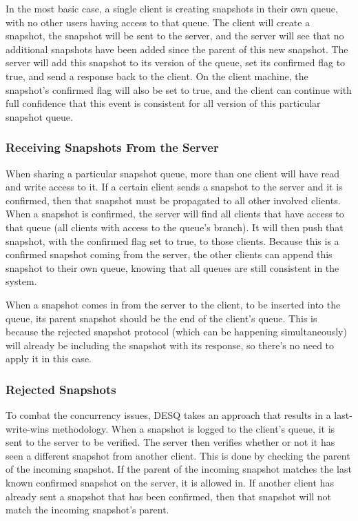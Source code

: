In the most basic case, a single client is creating snapshots in their own queue, with no other users having access to that queue. The client will create a snapshot, the snapshot will be sent to the server, and the server will see that no additional snapshots have been added since the parent of this new snapshot. The server will add this snapshot to its version of the queue, set its confirmed flag to true, and send a response back to the client. On the client machine, the snapshot's confirmed flag will also be set to true, and the client can continue with full confidence that this event is consistent for all version of this particular snapshot queue.

\subsubsection{Receiving Snapshots From the Server}

When sharing a particular snapshot queue, more than one client will have read and write access to it. If a certain client sends a snapshot to the server and it is confirmed, then that snapshot must be propagated to all other involved clients. When a snapshot is confirmed, the server will find all clients that have access to that queue (all clients with access to the queue's branch). It will then push that snapshot, with the confirmed flag set to true, to those clients. Because this is a confirmed snapshot coming from the server, the other clients can append this snapshot to their own queue, knowing that all queues are still consistent in the system.

When a snapshot comes in from the server to the client, to be inserted into the queue, its parent snapshot should be the end of the client's queue. This is because the rejected snapshot protocol (which can be happening simultaneously) will already be including the snapshot with its response, so there's no need to apply it in this case. 

\subsubsection{Rejected Snapshots}

To combat the concurrency issues, DESQ takes an approach that results in a last-write-wins methodology. When a snapshot is logged to the client’s queue, it is sent to the server to be verified. The server then verifies whether or not it has seen a different snapshot from another client. This is done by checking the parent of the incoming snapshot. If the parent of the incoming snapshot matches the last known confirmed snapshot on the server, it is allowed in. If another client has already sent a snapshot that has been confirmed, then that snapshot will not match the incoming snapshot's parent.

